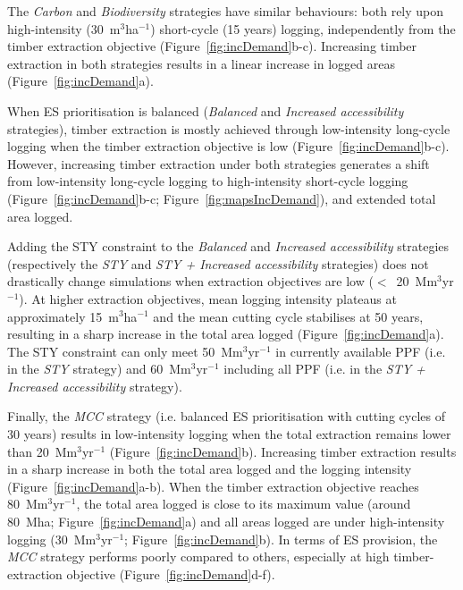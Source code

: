 \documentclass[12pt]{article}
\begin{document}
The \textit{Carbon} and \textit{Biodiversity} strategies have similar behaviours: both rely upon high-intensity (30~m$^3$ha$^{-1}$) short-cycle (15 years) logging, independently from the timber extraction objective (Figure~\ref{fig:incDemand}b-c). Increasing timber extraction in both strategies results in a linear increase in logged areas (Figure~\ref{fig:incDemand}a).

When ES prioritisation is balanced (\textit{Balanced} and \textit{Increased accessibility} strategies), timber extraction is mostly achieved through low-intensity long-cycle logging when the timber extraction objective is low (Figure~\ref{fig:incDemand}b-c). However, increasing timber extraction under both strategies generates a shift from low-intensity long-cycle logging to high-intensity short-cycle logging (Figure~\ref{fig:incDemand}b-c; Figure~\ref{fig:mapsIncDemand}), and extended total area logged.

Adding the STY constraint to the \textit{Balanced} and \textit{Increased accessibility} strategies (respectively the \textit{STY} and \textit{STY + Increased accessibility} strategies) does not drastically change simulations when extraction objectives are low ($<$~20~Mm$^3$yr$^{-1}$). At higher extraction objectives, mean logging intensity plateaus at approximately 15~m$^3$ha$^{-1}$ and the mean cutting cycle stabilises at 50 years, resulting in a sharp increase in the total area logged (Figure~\ref{fig:incDemand}a). The STY constraint can only meet 50~Mm$^3$yr$^{-1}$ in currently available PPF (i.e. in the \textit{STY} strategy) and 60~Mm$^3$yr$^{-1}$ including all PPF (i.e. in the \textit{STY + Increased accessibility} strategy).

Finally, the \textit{MCC} strategy (i.e. balanced ES prioritisation with cutting cycles of 30 years) results in low-intensity logging when the total extraction remains lower than 20~Mm$^3$yr$^{-1}$ (Figure~\ref{fig:incDemand}b). Increasing timber extraction results in a sharp increase in both the total area logged and the logging intensity (Figure~\ref{fig:incDemand}a-b). When the timber extraction objective reaches 80~Mm$^3$yr$^{-1}$, the total area logged is close to its maximum value (around 80~Mha; Figure~\ref{fig:incDemand}a) and all areas logged are under high-intensity logging (30~Mm$^3$yr$^{-1}$; Figure~\ref{fig:incDemand}b). In terms of ES provision, the \textit{MCC} strategy performs poorly compared to others, especially at high timber-extraction objective (Figure~\ref{fig:incDemand}d-f).
\end{document}
